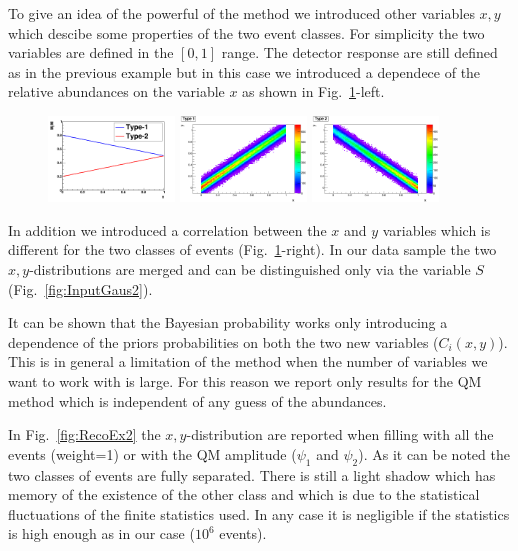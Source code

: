To give an idea of the powerful of the method we introduced other variables
$x,y$ which descibe some properties of the two event classes.
For simplicity the two variables are defined in the $[0,1]$ range.
The detector response are still defined as in the previous example but in this
case we introduced a dependece of the relative abundances on the variable $x$
as shown in Fig.~\ref{fig:SimEx2}-left.

\begin{figure}[!htb]
\centering
\includegraphics[width=0.3\textwidth]{../png/figAbundances.png}
\includegraphics[width=0.3\textwidth]{../png/figType1.png}
\includegraphics[width=0.3\textwidth]{../png/figType2.png}
\caption{}
\label{fig:SimEx2}
\end{figure}

In addition we introduced a correlation between the $x$ and $y$ variables
which is different for the two classes of events (Fig.~\ref{fig:SimEx2}-right). 
In our data sample the two $x,y$-distributions are merged and can be
distinguished only via the variable $S$ (Fig.~\ref{fig:InputGaus2}).

It can be shown that the Bayesian probability works only introducing a
dependence of the priors probabilities on both the two new variables
($C_{i}(x,y)$). This is in general a limitation of the method when the
  number of variables we want to work with is large.
For this reason we report only results for the QM method which is independent
of any guess of the abundances.

In Fig.~\ref{fig:RecoEx2} the $x,y$-distribution are reported when filling
with all the events (weight=1) or with the QM amplitude ($\psi_1$ and $\psi_2$).
As it can be noted the two classes of events are fully separated.
There is still a light shadow which has memory of the existence of the other
class and which is due to the statistical fluctuations of the finite
statistics used. In any case it is negligible if the statistics is high enough
as in our case ($10^{6}$ events).

